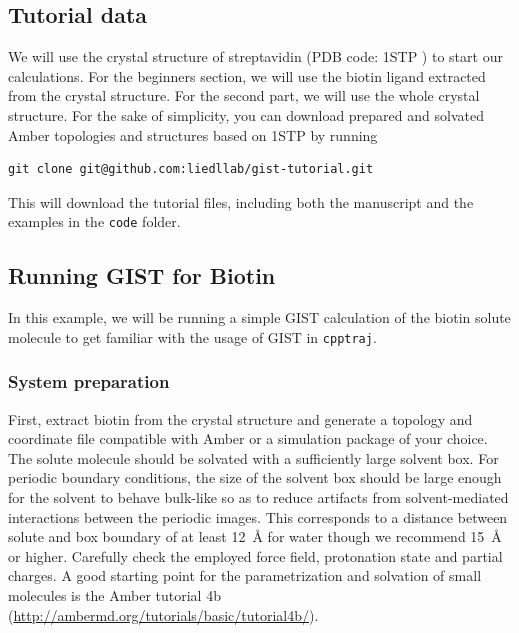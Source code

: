 \documentclass[9pt,tutorial]{livecoms}
\newcommand{\software}{\texttt}
\newcommand\inlinecode{\texttt}
\begin{document}
\subsection{Tutorial data}
We will use the crystal structure of streptavidin (PDB code: 1STP \cite{Weber1989-streptavidin-structure}) to start our calculations.
For the beginners section, we will use the biotin ligand extracted from the crystal structure.
For the second part, we will use the whole crystal structure.
For the sake of simplicity, you can download prepared and solvated Amber topologies and structures based on 1STP by running
\begin{lstlisting}[style=bash]
git clone git@github.com:liedllab/gist-tutorial.git
\end{lstlisting}
This will download the tutorial files, including both the manuscript and the examples in the \inlinecode{code} folder.

\subsection{Running GIST for Biotin}
In this example, we will be running a simple GIST calculation of the biotin solute molecule to get familiar with the usage of GIST in \software{cpptraj}.
\subsubsection{System preparation}
First, extract biotin from the crystal structure and generate a topology and coordinate file compatible with Amber or a simulation package of your choice.
The solute molecule should be solvated with a sufficiently large solvent box. 
For periodic boundary conditions, the size of the solvent box should be large enough for the solvent to behave bulk-like so as to reduce artifacts from solvent-mediated interactions between the periodic images. 
This corresponds to a distance between solute and box boundary of at least \SI{12}{\angstrom} for water \cite{Chen2021,Waibl2022-gist-solvents} though we recommend \SI{15}{\angstrom} or higher.
Carefully check the employed force field, protonation state and partial charges.
A good starting point for the parametrization and solvation of small molecules is the Amber tutorial 4b (\url{http://ambermd.org/tutorials/basic/tutorial4b/}).
\end{document}
